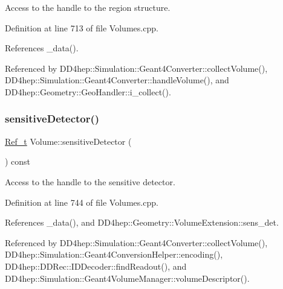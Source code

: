 Access to the handle to the region structure. 



Definition at line 713 of file Volumes.\+cpp.



References \+\_\+data().



Referenced by D\+D4hep\+::\+Simulation\+::\+Geant4\+Converter\+::collect\+Volume(), D\+D4hep\+::\+Simulation\+::\+Geant4\+Converter\+::handle\+Volume(), and D\+D4hep\+::\+Geometry\+::\+Geo\+Handler\+::i\+\_\+collect().

\hypertarget{class_d_d4hep_1_1_geometry_1_1_volume_a094839ee3155de449a36ca927ec17d2d}{}\label{class_d_d4hep_1_1_geometry_1_1_volume_a094839ee3155de449a36ca927ec17d2d} 
\subsubsection{\texorpdfstring{sensitive\+Detector()}{sensitiveDetector()}}
{\footnotesize\ttfamily \hyperlink{group___d_d4_h_e_p___g_e_o_m_e_t_r_y_ga40af83be6718bb8828a3d83dc7f8c930}{Ref\+\_\+t} Volume\+::sensitive\+Detector (\begin{DoxyParamCaption}{ }\end{DoxyParamCaption}) const}



Access to the handle to the sensitive detector. 



Definition at line 744 of file Volumes.\+cpp.



References \+\_\+data(), and D\+D4hep\+::\+Geometry\+::\+Volume\+Extension\+::sens\+\_\+det.



Referenced by D\+D4hep\+::\+Simulation\+::\+Geant4\+Converter\+::collect\+Volume(), D\+D4hep\+::\+Simulation\+::\+Geant4\+Conversion\+Helper\+::encoding(), D\+D4hep\+::\+D\+D\+Rec\+::\+I\+D\+Decoder\+::find\+Readout(), and D\+D4hep\+::\+Simulation\+::\+Geant4\+Volume\+Manager\+::volume\+Descriptor().

\hypertarget{class_d_d4hep_1_1_geometry_1_1_volume_a941f3319c6a0014bd8da831c0a4580aa}{}\label{class_d_d4hep_1_1_geometry_1_1_volume_a941f3319c6a0014bd8da831c0a4580aa} 
